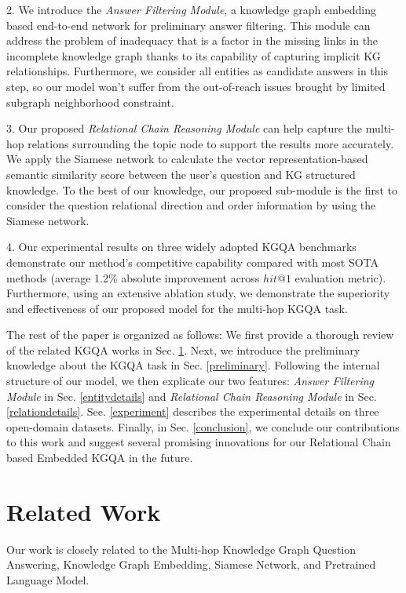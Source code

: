 \documentclass[pdflatex,sn-mathphys]{sn-jnl}%
\theoremstyle{thmstyleone}%
\theoremstyle{thmstyletwo}%
\theoremstyle{thmstylethree}%
\begin{document}
2. We introduce the \textit{Answer Filtering Module}, a knowledge graph embedding based end-to-end network for preliminary answer filtering. This module can address the problem of inadequacy that is a factor in the missing links in the incomplete knowledge graph thanks to its capability of capturing implicit KG relationships. Furthermore, we consider all entities as candidate answers in this step, so our model won't suffer from the out-of-reach issues brought by limited subgraph neighborhood constraint.

3. Our proposed \textit{Relational Chain Reasoning Module} can help capture the multi-hop relations surrounding the topic node to support the results more accurately. We apply the Siamese network \cite{sia2016jonas} to calculate the vector representation-based semantic similarity score between the user's question and KG structured knowledge. To the best of our knowledge, our proposed sub-module is the first to consider the question relational direction and order information by using the Siamese network.

4. Our experimental results on three widely adopted KGQA benchmarks demonstrate our method's competitive capability compared with most SOTA methods (average 1.2\% absolute improvement across $hit@1$ evaluation metric). Furthermore, using an extensive ablation study, we demonstrate the superiority and effectiveness of our proposed model for the multi-hop KGQA task.

The rest of the paper is organized as follows: We first provide a thorough review of the related KGQA works in Sec. \ref{relatedwork}. Next, we introduce the preliminary knowledge about the KGQA task in Sec. \ref{preliminary}. Following the internal structure of our model, we then explicate our two features: \textit{Answer Filtering Module} in Sec. \ref{entitydetails} and \textit{Relational Chain Reasoning Module} in Sec. \ref{relationdetails}. Sec. \ref{experiment} describes the experimental details on three open-domain datasets. Finally, in Sec. \ref{conclusion}, we conclude our contributions to this work and suggest several promising innovations for our Relational Chain based Embedded KGQA in the future.

\section{Related Work}\label{relatedwork}

Our work is closely related to the Multi-hop Knowledge Graph Question Answering, Knowledge Graph  Embedding, Siamese Network, and Pretrained Language Model.
\end{document}

